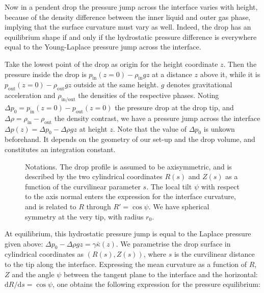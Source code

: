 \documentclass[fleqn]{scrartcl}
\newcommand{\ud}{\mathrm{d}}%
\begin{document}
Now in a pendent drop the pressure jump across the interface varies
with height, because of the density difference between the inner
liquid and outer gas phase, implying that the surface curvature must
vary as well. Indeed, the drop has an equilibrium shape if and only if
the hydrostatic pressure difference is everywhere equal to the
Young-Laplace pressure jump across the interface.

Take the lowest point of the drop as origin for the height coordinate
$z$. Then the pressure inside the drop is $p_{\mathrm{in}}(z=0) -
\rho_{\mathrm{in}} g z$ at a distance $z$ above it, while it is
$p_{\mathrm{out}}(z=0) - \rho_{\mathrm{out}} g z$ outside at the same
height. $g$ denotes gravitational acceleration and
$\rho_{\mathrm{in/out}}$ the densities of the respective phases.
Noting $\Delta\! p_0 = p_{\mathrm{in}}(z=0) - p_{\mathrm{out}}(z=0)$
the pressure drop at the drop tip, and $\Delta\!\rho =
\rho_{\mathrm{in}} - \rho_{\mathrm{out}}$ the density contrast, we
have a pressure jump across the interface $\Delta\! p(z) = \Delta\!
p_0 - \Delta\!\rho g z$ at height $z$. Note that the value of
$\Delta\! p_0$ is unkown beforehand. It depends on the geometry of our
set-up and the drop volume, and constitutes an integration constant.

\begin{figure}
  \begin{captionbeside}{Notations. The drop profile is assumed to be
      axisymmetric, and is described by the two cylindrical coordinates
      $R(s)$ and $Z(s)$ as a function of the curvilinear parameter
      $s$. The local tilt $\psi$ with respect to the axis normal
      enters the expression for the interface curvature, and is
      related to $R$ through $R' = \cos\psi$. We have spherical
      symmetry at the very tip, with radius $r_0$.}
    
  \end{captionbeside}
  \label{fig:notations}
\end{figure}

At equilibrium, this hydrostatic pressure jump is equal to the Laplace
pressure given above: $\Delta\! p_0 - \Delta\!\rho g z = \gamma
\bar\kappa(z)$. We parametrise the drop surface in cylindrical
coordinates as $(R(s), Z(s))$, where $s$ is the curvilinear distance
to the tip along the interface. Expressing the mean curvature as a
function of $R$, $Z$ and the angle $\psi$ between the tangent plane to
the interface and the horizontal: $\ud R/\ud s = \cos\psi$, one obtains
the following expression for the pressure equilibrium:
\end{document}
